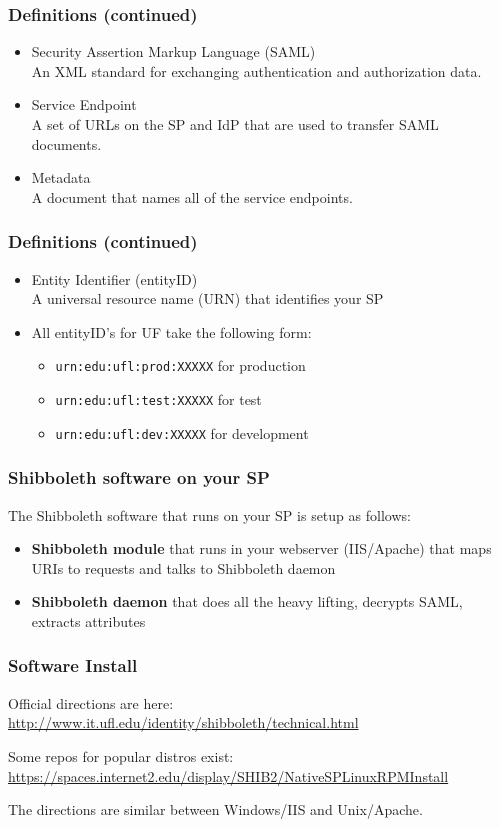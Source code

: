 \begin{frame}
\frametitle{Definitions (continued)}
\begin{itemize}
\item Security Assertion Markup Language (SAML) \\ An XML standard for exchanging authentication and authorization data.
\item Service Endpoint \\ A set of URLs on the SP and IdP that are used to transfer SAML documents.
\item Metadata \\ A document that names all of the service endpoints.
\end{itemize}
\end{frame}

\begin{frame}
\frametitle{Definitions (continued)}
\begin{itemize}
\item Entity Identifier (entityID) \\ A universal resource name (URN) that identifies your SP
\item All entityID's for UF take the following form: \begin{itemize}
\item \texttt{urn:edu:ufl:prod:XXXXX} for production
\item \texttt{urn:edu:ufl:test:XXXXX} for test
\item \texttt{urn:edu:ufl:dev:XXXXX} for development
\end{itemize}
\end{itemize}
\end{frame}

\begin{frame}
\frametitle{Shibboleth software on your SP}
The Shibboleth software that runs on your SP is setup as follows:
\begin{itemize}
\item \textbf{Shibboleth module} that runs in your webserver (IIS/Apache) that maps URIs to requests and talks to Shibboleth daemon
\item \textbf{Shibboleth daemon} that does all the heavy lifting, decrypts SAML, extracts attributes
\end{itemize}
\end{frame}

\begin{frame}
\frametitle{Software Install}
Official directions are here: \\
{\small \url{http://www.it.ufl.edu/identity/shibboleth/technical.html}}

\bigskip
Some repos for popular distros exist: \\
{\small \url{https://spaces.internet2.edu/display/SHIB2/NativeSPLinuxRPMInstall}}

\bigskip
The directions are similar between Windows/IIS and Unix/Apache.
\end{frame}

